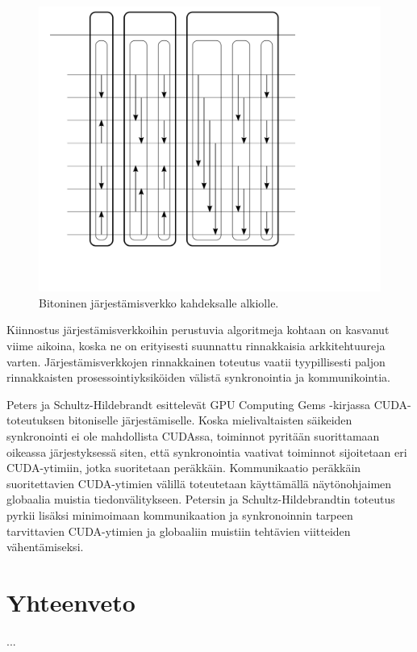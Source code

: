 \documentclass[a4paper,11pt]{article}
\begin{document}

\begin{figure}
\centering
\includegraphics[scale = 0.8]{bitonic}
\caption{Bitoninen järjestämisverkko kahdeksalle alkiolle.}
\label{fig:bitonicsort}
\end{figure}

Kiinnostus järjestämisverkkoihin perustuvia algoritmeja kohtaan on kasvanut viime aikoina, koska ne on erityisesti suunnattu rinnakkaisia arkkitehtuureja varten. Järjestämisverkkojen rinnakkainen toteutus vaatii tyypillisesti paljon rinnakkaisten prosessointiyksiköiden välistä synkronointia ja kommunikointia.

Peters ja Schultz-Hildebrandt \cite{peters2012gems} esittelevät GPU Computing Gems -kirjassa CUDA-toteutuksen bitoniselle järjestämiselle. Koska mielivaltaisten säikeiden synkronointi ei ole mahdollista CUDAssa, toiminnot pyritään suorittamaan oikeassa järjestyksessä siten, että synkronointia vaativat toiminnot sijoitetaan eri CUDA-ytimiin, jotka suoritetaan peräkkäin. Kommunikaatio peräkkäin suoritettavien CUDA-ytimien välillä toteutetaan käyttämällä näytönohjaimen globaalia muistia tiedonvälitykseen. Petersin ja Schultz-Hildebrandtin toteutus pyrkii lisäksi minimoimaan kommunikaation ja synkronoinnin tarpeen tarvittavien CUDA-ytimien ja globaaliin muistiin tehtävien viitteiden vähentämiseksi.


\section{Yhteenveto}

...

\printbibliography
\end{document}

